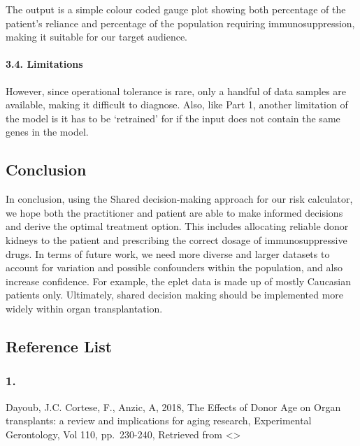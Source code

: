 \documentclass[a4paper,9pt,twocolumn,twoside,]{pinp}
\begin{document}
The output is a simple colour coded gauge plot showing both percentage
of the patient's reliance and percentage of the population requiring
immunosuppression, making it suitable for our target audience.

\hypertarget{limitations-2}{%
\paragraph{3.4. Limitations}\label{limitations-2}}

However, since operational tolerance is rare, only a handful of data
samples are available, making it difficult to diagnose. Also, like Part
1, another limitation of the model is it has to be `retrained' for if
the input does not contain the same genes in the model.

\hypertarget{conclusion}{%
\subsection{Conclusion}\label{conclusion}}

In conclusion, using the Shared decision-making approach for our risk
calculator, we hope both the practitioner and patient are able to make
informed decisions and derive the optimal treatment option. This
includes allocating reliable donor kidneys to the patient and
prescribing the correct dosage of immunosuppressive drugs. In terms of
future work, we need more diverse and larger datasets to account for
variation and possible confounders within the population, and also
increase confidence. For example, the eplet data is made up of mostly
Caucasian patients only. Ultimately, shared decision making should be
implemented more widely within organ transplantation.

\newpage

\hypertarget{reference-list}{%
\subsection{Reference List}\label{reference-list}}

\hypertarget{section}{%
\subsubsection{1.}\label{section}}

Dayoub, J.C. Cortese, F., Anzic, A, 2018, The Effects of Donor Age on
Organ transplants: a review and implications for aging research,
Experimental Gerontology, Vol 110, pp.~230-240, Retrieved from
\textless{}\textgreater{}
\end{document}
